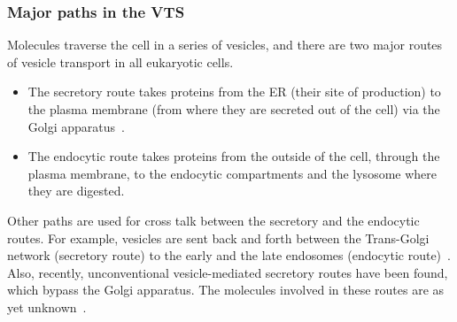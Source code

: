 \subsubsection{Major paths in the VTS}
Molecules traverse the cell in a series of vesicles, and there are two major routes of vesicle transport in all eukaryotic cells.
%
\begin{itemize}
	\item The secretory route takes proteins from the ER (their site of production) to the plasma membrane (from where they are secreted out of the cell) via the Golgi apparatus~\cite{alberts2002molecular}.
	\item The endocytic route takes proteins from the outside of the cell, through the plasma membrane, to the endocytic compartments and the lysosome where they are digested. 
\end{itemize}
Other paths are used for cross talk between the secretory and the endocytic routes. For example, vesicles are sent back and forth between the Trans-Golgi network (secretory route) to the early and the late endosomes (endocytic route)~\cite{progida2016bidirectional}. Also, recently, unconventional vesicle-mediated secretory routes have been found, which bypass the Golgi apparatus. The molecules involved in these routes are as yet unknown~\cite{nickel2018unconventional}. 
%

